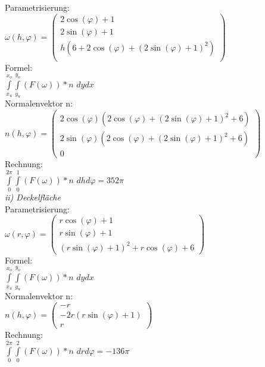 \documentclass[11pt,final]{scrreprt}
\begin{document}
Parametrisierung:\\
$ \omega(h, \varphi) = \left(\begin{matrix}
2\cos(\varphi)+1\\ 2\sin(\varphi)+1\\ h(6+2\cos(\varphi)+(2\sin(\varphi)+1)^2)\\
\end{matrix}\right) $\\

Formel:\\
$ \int\limits_{x_u}^{x_o}\int\limits_{y_u}^{y_o} (F(\omega)) * n$ $dydx$\\

Normalenvektor n:\\
$ n(h, \varphi) = \left(\begin{matrix}
2\cos(\varphi)(2\cos(\varphi) + (2\sin(\varphi) + 1)^2 + 6)\\2\sin(\varphi)(2\cos(\varphi) + (2\sin(\varphi) + 1)^2 + 6)\\0
\end{matrix}\right) $\\

Rechnung:\\
$ \int\limits_{0}^{2\pi}\int\limits_{0}^{1} (F(\omega)) * n$ $dhd\varphi = 352\pi$\\

\emph{ii) Deckelfläche}\\

Parametrisierung:\\
$ \omega(r, \varphi) = \left(\begin{matrix}
r\cos(\varphi) + 1\\r\sin(\varphi) + 1\\(r\sin(\varphi) + 1)^2 + r\cos(\varphi) + 6
\end{matrix}\right) $\\

Formel:\\
$ \int\limits_{x_u}^{x_o}\int\limits_{y_u}^{y_o} (F(\omega)) * n$ $dydx$\\

Normalenvektor n:\\
$ n(h, \varphi) = \left(\begin{matrix}
-r\\-2r(r\sin(\varphi) + 1)\\r
\end{matrix}\right) $\\

Rechnung:\\
$ \int\limits_{0}^{2\pi}\int\limits_{0}^{2} (F(\omega)) * n$ $drd\varphi = -136\pi$\\
\end{document}
